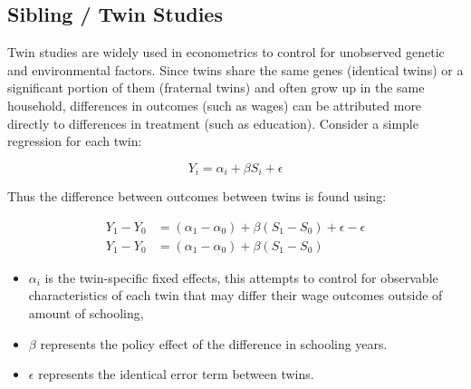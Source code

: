 \documentclass[../Main.tex]{subfiles}
\begin{document}
\begin{refsection}
\subsection{Sibling / Twin Studies}

Twin studies are widely used in econometrics to control for unobserved genetic
and environmental factors. Since twins share the same genes (identical twins) or
a significant portion of them (fraternal twins) and often grow up in the same
household, differences in outcomes (such as wages) can be attributed more
directly to differences in treatment (such as education). Consider a simple
regression for each twin:

\begin{equation}
    Y_i = \alpha_i + \beta S_i + \epsilon
\end{equation}


Thus the difference between outcomes between twins is found using:

\begin{equation}
    \begin{split}
        Y_1 - Y_0 &= (\alpha_1 - \alpha_0) + \beta(S_1 - S_0) + \epsilon - \epsilon \\ 
        Y_1 - Y_0 &= (\alpha_1 - \alpha_0) +\beta(S_1 - S_0)
    \end{split}
\end{equation}

\begin{itemize}

    \item $\alpha_i$ is the twin-specific fixed effects, this attempts to
    control for observable characteristics of each twin that may differ their
    wage outcomes outside of amount of schooling, 

    \item $\beta$ represents the policy effect of the difference in schooling years.

    \item $\epsilon$ represents the identical error term between twins. 
    
    
\end{itemize}



\end{refsection}
\end{document}
